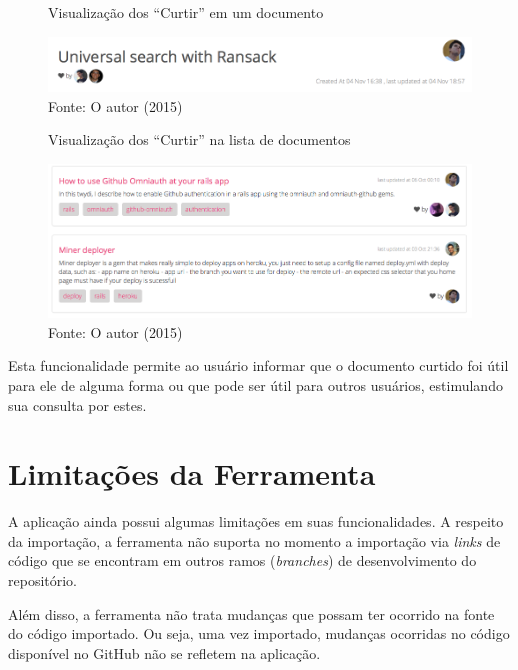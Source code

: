 \begin{figure}[h]
	\centering
    \caption{Visualização dos ``Curtir'' em um documento}
    \includegraphics[width=15cm]{Imagens/print-like-1.png}
	\caption*{Fonte: O autor (2015)}
\end{figure}

\begin{figure}[h]
	\centering
    \caption{Visualização dos ``Curtir'' na lista de documentos}
    \includegraphics[width=15cm]{Imagens/print-like-2.png}
	\caption*{Fonte: O autor (2015)}
\end{figure}

Esta funcionalidade permite ao usuário informar que o documento curtido foi útil para ele de alguma forma ou que pode ser útil para outros usuários, estimulando sua consulta por estes.

\section{Limitações da Ferramenta}

A aplicação ainda possui algumas limitações em suas funcionalidades. A respeito da importação, a ferramenta não suporta no momento a importação via \textit{links} de código que se encontram em outros ramos (\textit{branches}) de desenvolvimento do repositório.

Além disso, a ferramenta não trata mudanças que possam ter ocorrido na fonte do código importado. Ou seja, uma vez importado, mudanças ocorridas no código disponível no GitHub não se refletem na aplicação.

